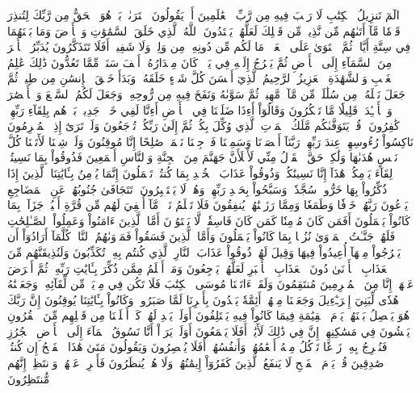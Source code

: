 الٓمٓ
تَنزِيلُ ٱلۡكِتَٰبِ لَا رَيۡبَ فِيهِ مِن رَّبِّ ٱلۡعَٰلَمِينَ
أَمۡ يَقُولُونَ ٱفۡتَرَىٰهُۚ بَلۡ هُوَ ٱلۡحَقُّ مِن رَّبِّكَ لِتُنذِرَ قَوۡمٗا مَّآ أَتَىٰهُم مِّن نَّذِيرٖ مِّن قَبۡلِكَ لَعَلَّهُمۡ يَهۡتَدُونَ
ٱللَّهُ ٱلَّذِي خَلَقَ ٱلسَّمَٰوَٰتِ وَٱلۡأَرۡضَ وَمَا بَيۡنَهُمَا فِي سِتَّةِ أَيَّامٖ ثُمَّ ٱسۡتَوَىٰ عَلَى ٱلۡعَرۡشِۖ مَا لَكُم مِّن دُونِهِۦ مِن وَلِيّٖ وَلَا شَفِيعٍۚ أَفَلَا تَتَذَكَّرُونَ
يُدَبِّرُ ٱلۡأَمۡرَ مِنَ ٱلسَّمَآءِ إِلَى ٱلۡأَرۡضِ ثُمَّ يَعۡرُجُ إِلَيۡهِ فِي يَوۡمٖ كَانَ مِقۡدَارُهُۥٓ أَلۡفَ سَنَةٖ مِّمَّا تَعُدُّونَ
ذَٰلِكَ عَٰلِمُ ٱلۡغَيۡبِ وَٱلشَّهَٰدَةِ ٱلۡعَزِيزُ ٱلرَّحِيمُ
ٱلَّذِيٓ أَحۡسَنَ كُلَّ شَيۡءٍ خَلَقَهُۥۖ وَبَدَأَ خَلۡقَ ٱلۡإِنسَٰنِ مِن طِينٖ
ثُمَّ جَعَلَ نَسۡلَهُۥ مِن سُلَٰلَةٖ مِّن مَّآءٖ مَّهِينٖ
ثُمَّ سَوَّىٰهُ وَنَفَخَ فِيهِ مِن رُّوحِهِۦۖ وَجَعَلَ لَكُمُ ٱلسَّمۡعَ وَٱلۡأَبۡصَٰرَ وَٱلۡأَفۡـِٔدَةَۚ قَلِيلٗا مَّا تَشۡكُرُونَ
وَقَالُوٓاْ أَءِذَا ضَلَلۡنَا فِي ٱلۡأَرۡضِ أَءِنَّا لَفِي خَلۡقٖ جَدِيدِۭۚ بَلۡ هُم بِلِقَآءِ رَبِّهِمۡ كَٰفِرُونَ
۞قُلۡ يَتَوَفَّىٰكُم مَّلَكُ ٱلۡمَوۡتِ ٱلَّذِي وُكِّلَ بِكُمۡ ثُمَّ إِلَىٰ رَبِّكُمۡ تُرۡجَعُونَ
وَلَوۡ تَرَىٰٓ إِذِ ٱلۡمُجۡرِمُونَ نَاكِسُواْ رُءُوسِهِمۡ عِندَ رَبِّهِمۡ رَبَّنَآ أَبۡصَرۡنَا وَسَمِعۡنَا فَٱرۡجِعۡنَا نَعۡمَلۡ صَٰلِحًا إِنَّا مُوقِنُونَ
وَلَوۡ شِئۡنَا لَأٓتَيۡنَا كُلَّ نَفۡسٍ هُدَىٰهَا وَلَٰكِنۡ حَقَّ ٱلۡقَوۡلُ مِنِّي لَأَمۡلَأَنَّ جَهَنَّمَ مِنَ ٱلۡجِنَّةِ وَٱلنَّاسِ أَجۡمَعِينَ
فَذُوقُواْ بِمَا نَسِيتُمۡ لِقَآءَ يَوۡمِكُمۡ هَٰذَآ إِنَّا نَسِينَٰكُمۡۖ وَذُوقُواْ عَذَابَ ٱلۡخُلۡدِ بِمَا كُنتُمۡ تَعۡمَلُونَ
إِنَّمَا يُؤۡمِنُ بِـَٔايَٰتِنَا ٱلَّذِينَ إِذَا ذُكِّرُواْ بِهَا خَرُّواْۤ سُجَّدٗاۤ وَسَبَّحُواْ بِحَمۡدِ رَبِّهِمۡ وَهُمۡ لَا يَسۡتَكۡبِرُونَ۩
تَتَجَافَىٰ جُنُوبُهُمۡ عَنِ ٱلۡمَضَاجِعِ يَدۡعُونَ رَبَّهُمۡ خَوۡفٗا وَطَمَعٗا وَمِمَّا رَزَقۡنَٰهُمۡ يُنفِقُونَ
فَلَا تَعۡلَمُ نَفۡسٞ مَّآ أُخۡفِيَ لَهُم مِّن قُرَّةِ أَعۡيُنٖ جَزَآءَۢ بِمَا كَانُواْ يَعۡمَلُونَ
أَفَمَن كَانَ مُؤۡمِنٗا كَمَن كَانَ فَاسِقٗاۚ لَّا يَسۡتَوُۥنَ
أَمَّا ٱلَّذِينَ ءَامَنُواْ وَعَمِلُواْ ٱلصَّـٰلِحَٰتِ فَلَهُمۡ جَنَّـٰتُ ٱلۡمَأۡوَىٰ نُزُلَۢا بِمَا كَانُواْ يَعۡمَلُونَ
وَأَمَّا ٱلَّذِينَ فَسَقُواْ فَمَأۡوَىٰهُمُ ٱلنَّارُۖ كُلَّمَآ أَرَادُوٓاْ أَن يَخۡرُجُواْ مِنۡهَآ أُعِيدُواْ فِيهَا وَقِيلَ لَهُمۡ ذُوقُواْ عَذَابَ ٱلنَّارِ ٱلَّذِي كُنتُم بِهِۦ تُكَذِّبُونَ
وَلَنُذِيقَنَّهُم مِّنَ ٱلۡعَذَابِ ٱلۡأَدۡنَىٰ دُونَ ٱلۡعَذَابِ ٱلۡأَكۡبَرِ لَعَلَّهُمۡ يَرۡجِعُونَ
وَمَنۡ أَظۡلَمُ مِمَّن ذُكِّرَ بِـَٔايَٰتِ رَبِّهِۦ ثُمَّ أَعۡرَضَ عَنۡهَآۚ إِنَّا مِنَ ٱلۡمُجۡرِمِينَ مُنتَقِمُونَ
وَلَقَدۡ ءَاتَيۡنَا مُوسَى ٱلۡكِتَٰبَ فَلَا تَكُن فِي مِرۡيَةٖ مِّن لِّقَآئِهِۦۖ وَجَعَلۡنَٰهُ هُدٗى لِّبَنِيٓ إِسۡرَـٰٓءِيلَ
وَجَعَلۡنَا مِنۡهُمۡ أَئِمَّةٗ يَهۡدُونَ بِأَمۡرِنَا لَمَّا صَبَرُواْۖ وَكَانُواْ بِـَٔايَٰتِنَا يُوقِنُونَ
إِنَّ رَبَّكَ هُوَ يَفۡصِلُ بَيۡنَهُمۡ يَوۡمَ ٱلۡقِيَٰمَةِ فِيمَا كَانُواْ فِيهِ يَخۡتَلِفُونَ
أَوَلَمۡ يَهۡدِ لَهُمۡ كَمۡ أَهۡلَكۡنَا مِن قَبۡلِهِم مِّنَ ٱلۡقُرُونِ يَمۡشُونَ فِي مَسَٰكِنِهِمۡۚ إِنَّ فِي ذَٰلِكَ لَأٓيَٰتٍۚ أَفَلَا يَسۡمَعُونَ
أَوَلَمۡ يَرَوۡاْ أَنَّا نَسُوقُ ٱلۡمَآءَ إِلَى ٱلۡأَرۡضِ ٱلۡجُرُزِ فَنُخۡرِجُ بِهِۦ زَرۡعٗا تَأۡكُلُ مِنۡهُ أَنۡعَٰمُهُمۡ وَأَنفُسُهُمۡۚ أَفَلَا يُبۡصِرُونَ
وَيَقُولُونَ مَتَىٰ هَٰذَا ٱلۡفَتۡحُ إِن كُنتُمۡ صَٰدِقِينَ
قُلۡ يَوۡمَ ٱلۡفَتۡحِ لَا يَنفَعُ ٱلَّذِينَ كَفَرُوٓاْ إِيمَٰنُهُمۡ وَلَا هُمۡ يُنظَرُونَ
فَأَعۡرِضۡ عَنۡهُمۡ وَٱنتَظِرۡ إِنَّهُم مُّنتَظِرُونَ